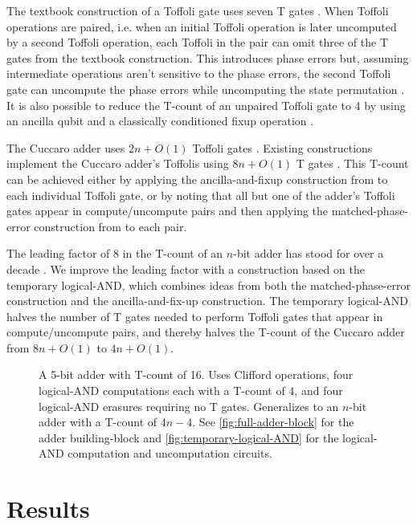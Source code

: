 \documentclass[twocolumn]{revtex4-1}
\begin{document}
The textbook construction of a Toffoli gate uses seven T gates \citep{Nielsen2009}.
When Toffoli operations are paired, i.e. when an initial Toffoli operation is later uncomputed by a second Toffoli operation, each Toffoli in the pair can omit three of the T gates from the textbook construction.
This introduces phase errors but, assuming intermediate operations aren't sensitive to the phase errors, the second Toffoli gate can uncompute the phase errors while uncomputing the state permutation \citep{Barenco1995, Nielsen2009}.
It is also possible to reduce the T-count of an unpaired Toffoli gate to 4 by using an ancilla qubit and a classically conditioned fixup operation \citep{Jones2013}.

The Cuccaro adder uses $2n + O(1)$ Toffoli gates \citep{Cuccaro2004}.
Existing constructions implement the Cuccaro adder's Toffolis using $8n + O(1)$ T gates \citep{Barenco1995, Cuccaro2004, Amy2013}.
This T-count can be achieved either by applying the ancilla-and-fixup construction from \citep{Jones2013} to each individual Toffoli gate, or by noting that all but one of the adder's Toffoli gates appear in compute/uncompute pairs and then applying the matched-phase-error construction from \citep{Barenco1995, Nielsen2009} to each pair.

The leading factor of 8 in the T-count of an $n$-bit adder has stood for over a decade \citep{Barenco1995, Cuccaro2004, AustinDiscussionsAndEmails2017}.
We improve the leading factor with a construction based on the temporary logical-AND, which combines ideas from both the matched-phase-error construction and the ancilla-and-fix-up construction.
The temporary logical-AND halves the number of T gates needed to perform Toffoli gates that appear in compute/uncompute pairs, and thereby halves the T-count of the Cuccaro adder from $8n + O(1)$ to $4n + O(1)$.

\begin{figure}
  
  \caption{
	A 5-bit adder with T-count of 16.
	Uses Clifford operations, four logical-AND computations each with a T-count of 4, and four logical-AND erasures requiring no T gates.
	Generalizes to an $n$-bit adder with a T-count of $4n - 4$.
	See \autoref{fig:full-adder-block} for the adder building-block and \autoref{fig:temporary-logical-AND} for the logical-AND computation and uncomputation circuits.
  }
  \label{fig:multi-bit-adder-example}
\end{figure}


\section*{Results}
\end{document}
